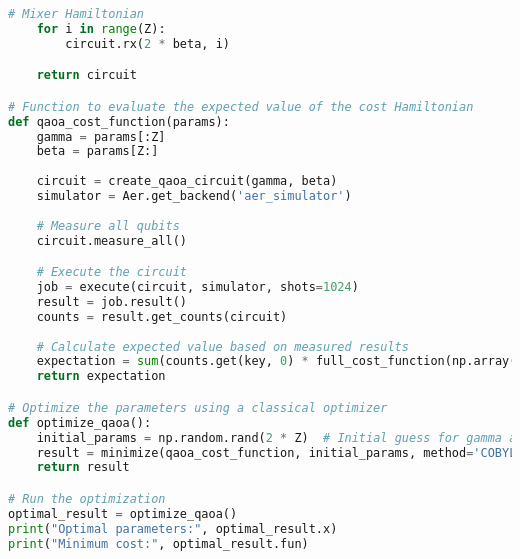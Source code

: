 \documentclass{article}
\begin{document}
\begin{lstlisting}[language=Python]
    # Mixer Hamiltonian
    for i in range(Z):
        circuit.rx(2 * beta, i)

    return circuit

# Function to evaluate the expected value of the cost Hamiltonian
def qaoa_cost_function(params):
    gamma = params[:Z]
    beta = params[Z:]
    
    circuit = create_qaoa_circuit(gamma, beta)
    simulator = Aer.get_backend('aer_simulator')
    
    # Measure all qubits
    circuit.measure_all()

    # Execute the circuit
    job = execute(circuit, simulator, shots=1024)
    result = job.result()
    counts = result.get_counts(circuit)
    
    # Calculate expected value based on measured results
    expectation = sum(counts.get(key, 0) * full_cost_function(np.array([int(bit) for bit in key])) for key in counts) / 1024
    return expectation

# Optimize the parameters using a classical optimizer
def optimize_qaoa():
    initial_params = np.random.rand(2 * Z)  # Initial guess for gamma and beta
    result = minimize(qaoa_cost_function, initial_params, method='COBYLA')
    return result

# Run the optimization
optimal_result = optimize_qaoa()
print("Optimal parameters:", optimal_result.x)
print("Minimum cost:", optimal_result.fun)


\end{lstlisting}
\end{document}
